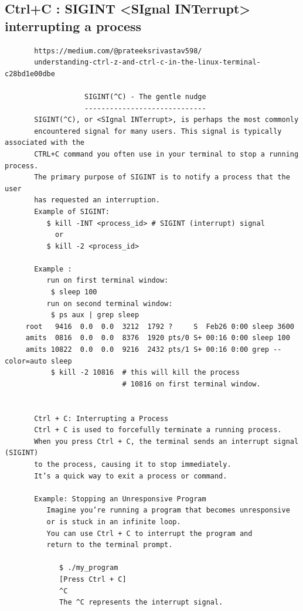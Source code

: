 \documentclass[a4paper,12pt]{article}
\begin{document}
\subsection{Ctrl+C     : SIGINT <SIgnal INTerrupt> interrupting a process  }
\begin{verbatim}
       https://medium.com/@prateeksrivastav598/ 
       understanding-ctrl-z-and-ctrl-c-in-the-linux-terminal-c28bd1e00dbe
       
                   SIGINT(^C) - The gentle nudge
                   -----------------------------
       SIGINT(^C), or <SIgnal INTerrupt>, is perhaps the most commonly
       encountered signal for many users. This signal is typically associated with the    
       CTRL+C command you often use in your terminal to stop a running process. 
       The primary purpose of SIGINT is to notify a process that the user 
       has requested an interruption.
       Example of SIGINT:
          $ kill -INT <process_id> # SIGINT (interrupt) signal
            or       
          $ kill -2 <process_id>
       
       Example :
          run on first terminal window:
           $ sleep 100  
          run on second terminal window:       
           $ ps aux | grep sleep
     root   9416  0.0  0.0  3212  1792 ?     S  Feb26 0:00 sleep 3600
     amits  0816  0.0  0.0  8376  1920 pts/0 S+ 00:16 0:00 sleep 100
     amits 10822  0.0  0.0  9216  2432 pts/1 S+ 00:16 0:00 grep --color=auto sleep
           $ kill -2 10816  # this will kill the process 
                            # 10816 on first terminal window.
       
       
       Ctrl + C: Interrupting a Process
       Ctrl + C is used to forcefully terminate a running process. 
       When you press Ctrl + C, the terminal sends an interrupt signal (SIGINT)
       to the process, causing it to stop immediately. 
       It’s a quick way to exit a process or command.

       Example: Stopping an Unresponsive Program
          Imagine you’re running a program that becomes unresponsive
          or is stuck in an infinite loop.
          You can use Ctrl + C to interrupt the program and 
          return to the terminal prompt.

             $ ./my_program
             [Press Ctrl + C]
             ^C
             The ^C represents the interrupt signal. 
\end{verbatim}
\end{document}
